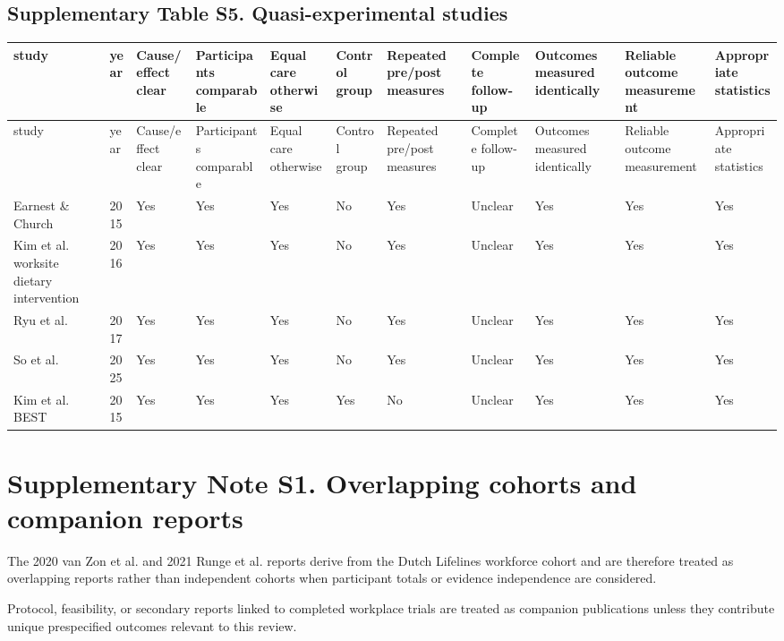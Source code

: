 \documentclass[10pt]{article}
\begin{document}
\subsection*{Supplementary Table S5. Quasi-experimental studies}
\scriptsize
\begin{longtable}{p{} p{} p{} p{} p{} p{} p{} p{} p{} p{} p{}}
\toprule
study & year & Cause/effect clear & Participants comparable & Equal care otherwise & Control group & Repeated pre/post measures & Complete follow-up & Outcomes measured identically & Reliable outcome measurement & Appropriate statistics \\
\midrule
\endfirsthead
\toprule
study & year & Cause/effect clear & Participants comparable & Equal care otherwise & Control group & Repeated pre/post measures & Complete follow-up & Outcomes measured identically & Reliable outcome measurement & Appropriate statistics \\
\midrule
\endhead
Earnest \& Church & 2015 & Yes & Yes & Yes & No & Yes & Unclear & Yes & Yes & Yes \\
Kim et al. worksite dietary intervention & 2016 & Yes & Yes & Yes & No & Yes & Unclear & Yes & Yes & Yes \\
Ryu et al. & 2017 & Yes & Yes & Yes & No & Yes & Unclear & Yes & Yes & Yes \\
So et al. & 2025 & Yes & Yes & Yes & No & Yes & Unclear & Yes & Yes & Yes \\
Kim et al. BEST & 2015 & Yes & Yes & Yes & Yes & No & Unclear & Yes & Yes & Yes \\
\bottomrule
\end{longtable}
\normalsize


\section*{Supplementary Note S1. Overlapping cohorts and companion reports}

The 2020 van Zon et al. and 2021 Runge et al. reports derive from the Dutch Lifelines workforce cohort and are therefore treated as overlapping reports rather than independent cohorts when participant totals or evidence independence are considered.

Protocol, feasibility, or secondary reports linked to completed workplace trials are treated as companion publications unless they contribute unique prespecified outcomes relevant to this review.
\end{document}

